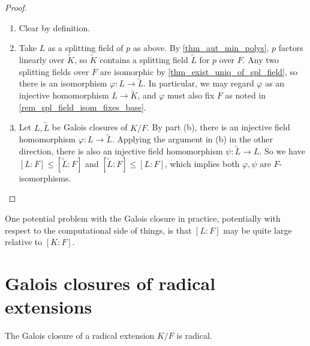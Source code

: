\begin{proof}~
    \begin{enumerate}[label=(\alph*)]
        \item Clear by definition.
        \item Take $L$ as a splitting field of $p$ as above. By \cref{thm_aut_min_polys}, $p$ factors linearly over $\widetilde{K}$, so $\widetilde{K}$ contains a splitting field $\widetilde{L}$ for $p$ over $F$. Any two splitting fields over $F$ are isomorphic by \cref{thm_exist_uniq_of_spl_field}, so there is an isomorphism $\varphi: L \to \widetilde{L}$. In particular, we may regard $\varphi$ as an injective homomorphism $L \to \widetilde{K}$, and $\varphi$ must also fix $F$ as noted in \cref{rem_spl_field_isom_fixes_base}.
        \item Let $L, \widetilde{L}$ be Galois closures of $K/F$. By part (b), there is an injective field homomorphism $\varphi: L \to \widetilde{L}$. Applying the argument in (b) in the other direction, there is also an injective field homomorphism $\psi: \widetilde{L} \to L$. So we have $[L : F] \leq [\widetilde{L} : F]$ and $[\widetilde{L} : F] \leq [L : F]$, which implies both $\varphi, \psi$ are $F$-isomorphisms. \qedhere
    \end{enumerate}
\end{proof}

\begin{remark}
    One potential problem with the Galois closure in practice, potentially with respect to the computational side of things, is that $[L : F]$ may be quite large relative to $[K : F]$.
\end{remark}

\section{Galois closures of radical extensions}

\begin{proposition}
\label{prop_gal_closure_of_rad_ext}
    The Galois closure of a radical extension $K/F$ is radical.
\end{proposition}

